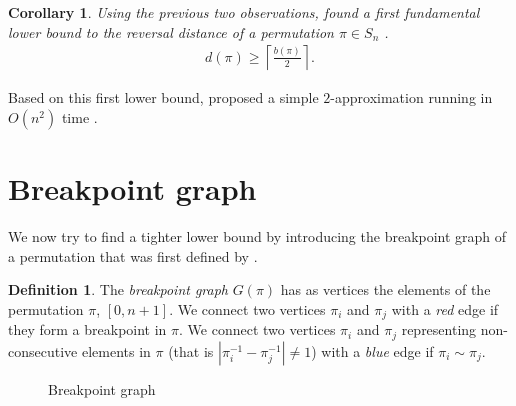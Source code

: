 \documentclass[11pt,DIV=11]{scrartcl}
\newtheorem{corollary}{Corollary}[theorem]
\theoremstyle{definition}
\newtheorem{definition}[theorem]{Definition}
\theoremstyle{remark}
\begin{document}
\begin{corollary}
Using the previous two observations, \citeauthor*{Kececioglu1995} found a first fundamental lower bound to the reversal distance of a permutation $\pi \in S_n$ \cite{Kececioglu1995}.
\begin{align*}
    d(\pi) \geq \left\lceil \frac{b(\pi)}{2} \right\rceil.
\end{align*}
\end{corollary}

Based on this first lower bound, \citeauthor*{Kececioglu1995} proposed a simple $2$-approximation running in $O(n^2)$ time \cite{Kececioglu1995}.

\section{Breakpoint graph}
\label{sec:breakpoint_graph}

We now try to find a tighter lower bound by introducing the breakpoint graph of a permutation that was first defined by \citeauthor*{Bafna1996}.

\begin{definition}
The \textit{breakpoint graph} $G(\pi)$ has as vertices the elements of the permutation $\pi$, $[0, n+1]$. We connect two vertices $\pi_i$ and $\pi_j$ with a \textit{red} edge if they form a breakpoint in $\pi$. We connect two vertices $\pi_i$ and $\pi_j$ representing non-consecutive elements in $\pi$ (that is $|\pi_i^{-1} - \pi_j^{-1}| \neq 1$) with a \textit{blue} edge if $\pi_i \sim \pi_j$.
\end{definition}

\begin{figure}
    \centering
    \caption{Breakpoint graph}
    \label{fig:breakpoint_graph}
\end{figure}
\end{document}
